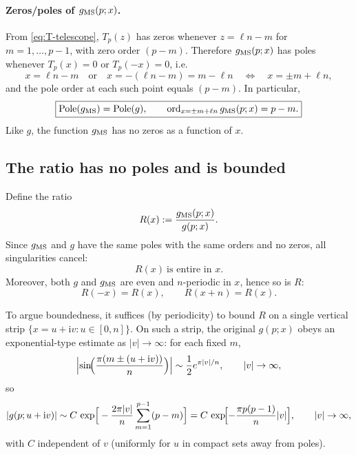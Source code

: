 \documentclass[11pt]{article}
\newcommand{\ii}{\mathrm{i}}
\begin{document}
  \paragraph{Zeros/poles of $g_{\rm MS}(p;x)$.}
  From \eqref{eq:T-telescope}, $T_{p}(z)$ has zeros whenever $z=\ell n-m$ for $m=
  1,\dots,p-1$, with zero order $(p-m)$. Therefore $g_{\rm MS}(p;x)$ has poles whenever
  $T_{p}(x)=0$ or $T_{p}(-x)=0$, i.e.
  \begin{equation}
    x=\ell n-m\quad \text{or}\quad x=-(\ell n-m)=m-\ell n \quad\Longleftrightarrow
    \quad x=\pm m+\ell n,
  \end{equation}
  and the pole order at each such point equals $(p-m)$. In particular,
  \begin{equation}
    \boxed{ \mathrm{Pole}(g_{\rm MS})=\mathrm{Pole}(g),\qquad \mathrm{ord}_{x=\pm m+\ell n}\,g_{\rm MS}(p;x)=p-m. }
  \end{equation}
  Like $g$, the function $g_{\rm MS}$ has no zeros as a function of $x$.

  \subsection*{The ratio has no poles and is bounded}

  Define the ratio
  \begin{equation}
    R(x):=\frac{g_{\rm MS}(p;x)}{g(p;x)}.
  \end{equation}
  Since $g_{\rm MS}$ and $g$ have the same poles with the same orders and no zeros,
  all singularities cancel:
  \begin{equation}
    \boxed{R(x)\ \text{is entire in }x.}
  \end{equation}
  Moreover, both $g$ and $g_{\rm MS}$ are even and $n$-periodic in $x$, hence so
  is $R$:
  \begin{equation}
    R(-x)=R(x),\qquad R(x+n)=R(x). \label{eq:R-periodic}
  \end{equation}

  To argue boundedness, it suffices (by periodicity) to bound $R$ on a single
  vertical strip $\{x=u+\ii v: u\in[0,n]\}$. On such a strip, the original
  $g(p;x)$ obeys an exponential-type estimate as $|v|\to\infty$: for each fixed $m$,
  \begin{equation}
    \Bigl|\sin\!\Bigl(\frac{\pi(m\pm(u+\ii v))}{n}\Bigr)\Bigr| \sim \frac{1}{2}e^{\pi
    |v|/n}, \qquad |v|\to\infty,
  \end{equation}
  so
  \begin{equation}
    |g(p;u+\ii v)| \sim C\,\exp\!\Big[-\frac{2\pi|v|}{n}\sum_{m=1}^{p-1}(p-m)\Big] = C\,\exp\!\Bigl[-\frac{\pi p(p-1)}{n}|v|\Bigr], \qquad |v|\to\infty, \label{eq:g-asymp}
  \end{equation}
  with $C$ independent of $v$ (uniformly for $u$ in compact sets away from poles).
\end{document}
